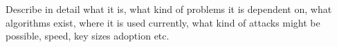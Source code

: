 Describe in detail what it is, what kind of problems it is dependent on, what algorithms exist, where it is used currently, what kind of attacks might be possible, speed, key sizes adoption etc.
